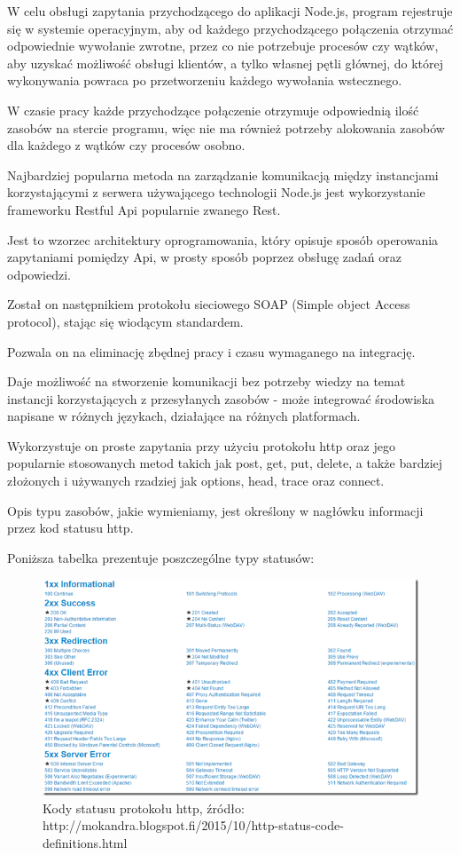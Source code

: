 \documentclass[12pt]{report}
\begin{document}
W celu obsługi zapytania przychodzącego do aplikacji Node.js, program rejestruje się w systemie operacyjnym, aby od każdego przychodzącego połączenia otrzymać odpowiednie wywołanie zwrotne, przez co nie potrzebuje procesów czy wątków, aby uzyskać możliwość obsługi klientów, a tylko własnej pętli głównej, do której wykonywania powraca po przetworzeniu każdego wywołania wstecznego.

W czasie pracy każde przychodzące połączenie otrzymuje odpowiednią ilość zasobów na stercie programu, więc nie ma również potrzeby alokowania zasobów dla każdego z wątków czy procesów osobno.

Najbardziej popularna metoda na zarządzanie komunikacją między instancjami korzystającymi z serwera używającego technologii Node.js jest wykorzystanie frameworku Restful Api popularnie zwanego Rest.

Jest to wzorzec architektury oprogramowania, który opisuje sposób operowania zapytaniami pomiędzy Api, w prosty sposób poprzez obsługę zadań oraz odpowiedzi.

Został on następnikiem protokołu sieciowego SOAP (Simple object Access protocol), stając się wiodącym standardem.

Pozwala on na eliminację zbędnej pracy i czasu wymaganego na integrację.

Daje możliwość na stworzenie komunikacji bez potrzeby wiedzy na temat instancji korzystających z przesyłanych zasobów - może integrować środowiska napisane w różnych językach, działające na różnych platformach.

Wykorzystuje on proste zapytania przy użyciu protokołu http oraz jego popularnie stosowanych metod takich jak post, get, put, delete, a także bardziej złożonych i używanych rzadziej jak options, head, trace oraz connect.

Opis typu zasobów, jakie wymieniamy, jest określony w nagłówku informacji przez kod statusu http.

Poniższa tabelka prezentuje poszczególne typy statusów:
\newpage
\begin{figure}[!hb]
\centering
\includegraphics[width=\textwidth,height=\textheight,keepaspectratio]{statuses.png} 
\caption{Kody statusu protokołu http, źródło: http://mokandra.blogspot.fi/2015/10/http-status-code-definitions.html}
\end{figure}
\end{document}
